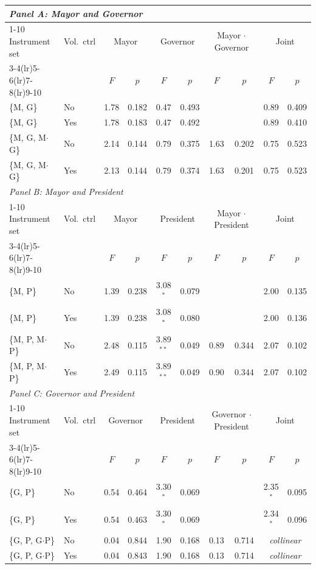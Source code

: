 \begin{tabular}{@{}llcccccccc@{}}
\toprule
\multicolumn{10}{l}{\textit{Panel A: Mayor and Governor}} \\
\cmidrule(lr){1-10}
Instrument set & Vol.\ ctrl & \multicolumn{2}{c}{Mayor} & \multicolumn{2}{c}{Governor} & \multicolumn{2}{c}{Mayor $\cdot$ Governor} & \multicolumn{2}{c}{Joint} \\
\cmidrule(lr){3-4}\cmidrule(lr){5-6}\cmidrule(lr){7-8}\cmidrule(lr){9-10}
 & & $F$ & $p$ & $F$ & $p$ & $F$ & $p$ & $F$ & $p$ \\
\midrule
\{M, G\} & No & 1.78 & 0.182 & 0.47 & 0.493 &  &  & 0.89 & 0.409 \\
\{M, G\} & Yes & 1.78 & 0.183 & 0.47 & 0.492 &  &  & 0.89 & 0.410 \\
\{M, G, M$\cdot$G\} & No & 2.14 & 0.144 & 0.79 & 0.375 & 1.63 & 0.202 & 0.75 & 0.523 \\
\{M, G, M$\cdot$G\} & Yes & 2.13 & 0.144 & 0.79 & 0.374 & 1.63 & 0.201 & 0.75 & 0.523 \\
\midrule
\multicolumn{10}{l}{\textit{Panel B: Mayor and President}} \\
\cmidrule(lr){1-10}
Instrument set & Vol.\ ctrl & \multicolumn{2}{c}{Mayor} & \multicolumn{2}{c}{President} & \multicolumn{2}{c}{Mayor $\cdot$ President} & \multicolumn{2}{c}{Joint} \\
\cmidrule(lr){3-4}\cmidrule(lr){5-6}\cmidrule(lr){7-8}\cmidrule(lr){9-10}
 & & $F$ & $p$ & $F$ & $p$ & $F$ & $p$ & $F$ & $p$ \\
\midrule
\{M, P\} & No & 1.39 & 0.238 & 3.08$^{*}$ & 0.079 &  &  & 2.00 & 0.135 \\
\{M, P\} & Yes & 1.39 & 0.238 & 3.08$^{*}$ & 0.080 &  &  & 2.00 & 0.136 \\
\{M, P, M$\cdot$P\} & No & 2.48 & 0.115 & 3.89$^{**}$ & 0.049 & 0.89 & 0.344 & 2.07 & 0.102 \\
\{M, P, M$\cdot$P\} & Yes & 2.49 & 0.115 & 3.89$^{**}$ & 0.049 & 0.90 & 0.344 & 2.07 & 0.102 \\
\midrule
\multicolumn{10}{l}{\textit{Panel C: Governor and President}} \\
\cmidrule(lr){1-10}
Instrument set & Vol.\ ctrl & \multicolumn{2}{c}{Governor} & \multicolumn{2}{c}{President} & \multicolumn{2}{c}{Governor $\cdot$ President} & \multicolumn{2}{c}{Joint} \\
\cmidrule(lr){3-4}\cmidrule(lr){5-6}\cmidrule(lr){7-8}\cmidrule(lr){9-10}
 & & $F$ & $p$ & $F$ & $p$ & $F$ & $p$ & $F$ & $p$ \\
\midrule
\{G, P\} & No & 0.54 & 0.464 & 3.30$^{*}$ & 0.069 &  &  & 2.35$^{*}$ & 0.095 \\
\{G, P\} & Yes & 0.54 & 0.463 & 3.30$^{*}$ & 0.069 &  &  & 2.34$^{*}$ & 0.096 \\
\{G, P, G$\cdot$P\} & No & 0.04 & 0.844 & 1.90 & 0.168 & 0.13 & 0.714 & \multicolumn{2}{c}{\textit{collinear}} \\
\{G, P, G$\cdot$P\} & Yes & 0.04 & 0.843 & 1.90 & 0.168 & 0.13 & 0.714 & \multicolumn{2}{c}{\textit{collinear}} \\
\bottomrule
\end{tabular}
